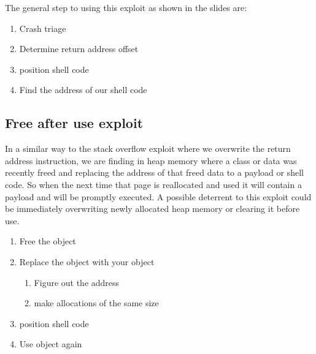 \documentclass[letterpaper,12pt,titlepage,onecolumn]{IEEEtran}
\begin{document}
The general step to using this exploit as shown in the slides are:
\begin{enumerate}
    \item Crash triage
    \item Determine return address offset
    \item position shell code
    \item Find the address of our shell code
\end{enumerate}

\subsection{Free after use exploit}
In a similar way to the stack overflow exploit where we overwrite the return address instruction, we are finding in heap memory where a class or data was recently freed and replacing the address of that freed data to a payload or shell code. So when the next time that page is reallocated and used it will contain a payload and will be promptly executed. A possible deterrent to this exploit could be immediately overwriting newly allocated heap memory or clearing it before use.

\begin{enumerate}
    \item Free the object
    \item Replace the object with your object
    \begin{enumerate}
        \item Figure out the address
        \item make allocations of the same size
    \end{enumerate}
    \item position shell code
    \item Use object again
\end{enumerate}
\end{document}
